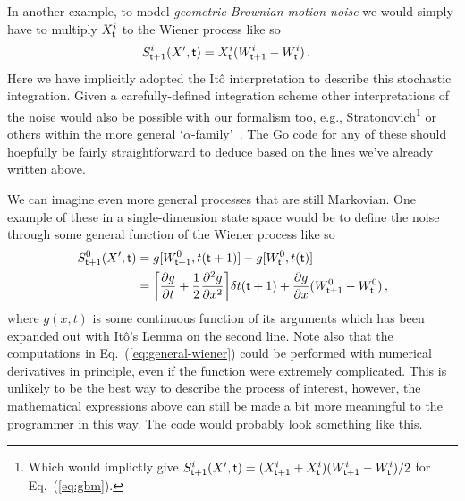 \documentclass{book}
\begin{document}
In another example, to model \emph{geometric Brownian motion noise} we would simply have to multiply $X^i_{\sf t}$ to the Wiener process like so
\begin{align}
& S^{i}_{{\sf t}+1}(X',{\sf t}) = X^i_{\sf t}(W^i_{{\sf t}+1}-W^i_{\sf t})\label{eq:gbm} \,.
\end{align}
Here we have implicitly adopted the Itô interpretation to describe this stochastic integration. Given a carefully-defined integration scheme other interpretations of the noise would also be possible with our formalism too, e.g., Stratonovich\footnote{Which would implictly give $S^{i}_{{\sf t}+1}(X',{\sf t}) = (X^i_{{\sf t}+1}+X^i_{\sf t})(W^i_{{\sf t}+1}-W^i_{\sf t}) / 2$ for Eq.~(\ref{eq:gbm}).} or others within the more general `$\alpha$-family'~\cite{van1992stochastic,risken1996fokker,rog-will-2000}. The Go code for any of these should hoepfully be fairly straightforward to deduce based on the lines we've already written above.

We can imagine even more general processes that are still Markovian. One example of these in a single-dimension state space would be to define the noise through some general function of the Wiener process like so
\begin{align}
S^0_{{\sf t}+1}(X',{\sf t}) &= g[W^0_{{\sf t}+1},t({\sf t}+1)]-g[W^0_{\sf t}, t({\sf t})] \\
&= \bigg[ \frac{\partial g}{\partial t} + \frac{1}{2}\frac{\partial^2 g}{\partial x^2} \bigg] \delta t ({\sf t}+1) + \frac{\partial g}{\partial x} (W^0_{{\sf t}+1}-W^0_{\sf t}) \label{eq:general-wiener}\,,
\end{align}
where $g(x,t)$ is some continuous function of its arguments which has been expanded out with Itô's Lemma on the second line. Note also that the computations in Eq.~(\ref{eq:general-wiener}) could be performed with numerical derivatives in principle, even if the function were extremely complicated. This is unlikely to be the best way to describe the process of interest, however, the mathematical expressions above can still be made a bit more meaningful to the programmer in this way. The code would probably look something like this.
\end{document}

